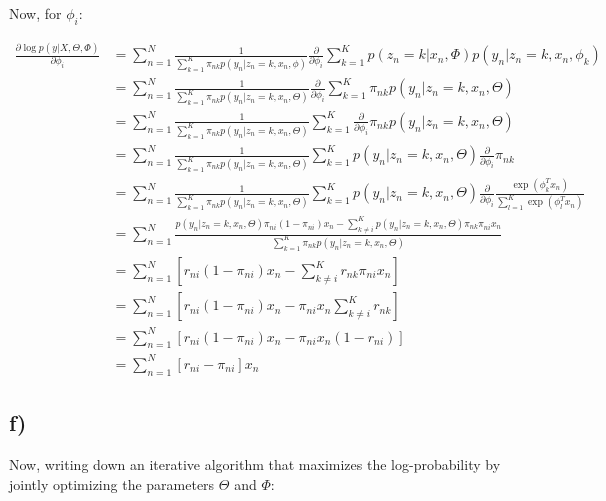 \documentclass[12pt,a4paper,oneside]{paper}
\begin{document}
Now, for $\phi_i$:

\begin{align*}
    \frac{\partial \log p(y | X, \Theta, \Phi)}{\partial \phi_i} &= \sum_{n=1}^{N} \frac{1}{\sum_{k=1}^{K} \pi_{nk} p(y_n | z_n = k, x_n, \phi)} \frac{\partial}{\partial \phi_i} \sum_{k=1}^{K} p(z_n = k | x_n, \Phi) p(y_n | z_n = k, x_n, \phi_k) \\
    &= \sum_{n=1}^{N} \frac{1}{\sum_{k=1}^{K} \pi_{nk} p(y_n | z_n = k, x_n, \Theta)} \frac{\partial}{\partial \phi_i} \sum_{k=1}^{K} \pi_{nk} p(y_n | z_n = k, x_n, \Theta) \\
    &= \sum_{n=1}^{N} \frac{1}{\sum_{k=1}^{K} \pi_{nk} p(y_n | z_n = k, x_n, \Theta)}  \sum_{k=1}^{K} \frac{\partial}{\partial \phi_i} \pi_{nk} p(y_n | z_n = k, x_n, \Theta) \\
    &= \sum_{n=1}^{N} \frac{1}{\sum_{k=1}^{K} \pi_{nk} p(y_n | z_n = k, x_n, \Theta)}  \sum_{k=1}^{K} p(y_n | z_n = k, x_n, \Theta) \frac{\partial}{\partial \phi_i} \pi_{nk}  \\
    &= \sum_{n=1}^{N} \frac{1}{\sum_{k=1}^{K} \pi_{nk} p(y_n | z_n = k, x_n, \Theta)}  \sum_{k=1}^{K} p(y_n | z_n = k, x_n, \Theta) \frac{\partial}{\partial \phi_i} \frac{\exp(\phi_k^T x_n)}{\sum_{l=1}^{K} \exp(\phi_l^T x_n)}  \\
    &= \sum_{n=1}^{N} \frac{p(y_n | z_n = k, x_n, \Theta) \pi_{ni} (1 - \pi_{ni}) x_n - \sum_{k \neq i}^{K} p(y_n | z_n = k, x_n, \Theta) \pi_{nk} \pi_{ni} x_n}{\sum_{k=1}^{K} \pi_{nk} p(y_n | z_n = k, x_n, \Theta)}   \\
    &= \sum_{n=1}^{N} \left[r_{ni} (1 - \pi_{ni}) x_n - \sum_{k \neq i}^{K} r_{nk} \pi_{ni} x_n \right] \\
    &= \sum_{n=1}^{N} \left[r_{ni} (1 - \pi_{ni}) x_n - \pi_{ni} x_n \sum_{k \neq i}^{K} r_{nk}\right]  \\
    &= \sum_{n=1}^{N} \left[r_{ni} (1 - \pi_{ni}) x_n - \pi_{ni} x_n (1 - r_{ni})\right] \\
    &= \sum_{n=1}^{N} \left[r_{ni} - \pi_{ni}\right] x_n
\end{align*}

\newpage
\subsection*{f)}

Now, writing down an iterative algorithm that maximizes the log-probability by jointly optimizing the parameters $\Theta$ and $\Phi$:
\end{document}
